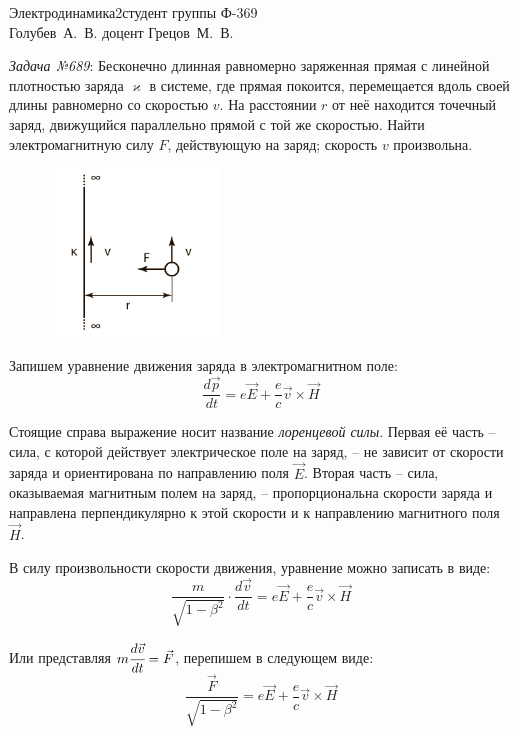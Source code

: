 





{Электродинамика}{2}{}{студент группы Ф-369\\Голубев~А.~В.}
{}{доцент Грецов~М.~В.}{}{}

\emph{Задача №689}: Бесконечно длинная равномерно заряженная прямая с линейной
плотностью заряда \( \varkappa \) в системе, где прямая покоится, перемещается
вдоль своей длины равномерно со скоростью \( v \). На расстоянии \( r \) от неё
находится точечный заряд, движущийся параллельно прямой с той же скоростью. 
Найти электромагнитную силу \( F \), действующую на заряд; скорость \( v \)
произвольна.
\begin{figure}[ht]
    \center
	\includegraphics[width=0.4\textwidth]{pdf/01.pdf}
\end{figure}

Запишем уравнение движения заряда в электромагнитном поле:
\[ \frac{d\vec{p}}{dt} = e\vec{E} + \frac{e}{c}\vec{v}\times\vec{H} \]

Стоящие справа выражение носит название \emph{лоренцевой силы}. Первая её 
часть -- сила, с которой действует электрическое поле на заряд, -- не зависит 
от скорости заряда и ориентирована по направлению поля \( \vec{E} \). Вторая 
часть -- сила, оказываемая магнитным полем на заряд, -- пропорциональна скорости 
заряда и направлена перпендикулярно к этой скорости и к направлению магнитного 
поля \( \vec{H} \).

В силу произвольности скорости движения, уравнение можно записать в виде:
\[ 
	\frac{m}{\sqrt{1-\beta^2}}\cdot\frac{d\vec{v}}{dt} = 
	e\vec{E} + \frac{e}{c}\vec{v}\times\vec{H} 
\]

Или представляя \( m\cfrac{d\vec{v}}{dt} = \vec{F} \), перепишем в следующем виде:
\[ \frac{\vec{F}}{\sqrt{1-\beta^2}} = e\vec{E} + \frac{e}{c}\vec{v}\times\vec{H} \]

